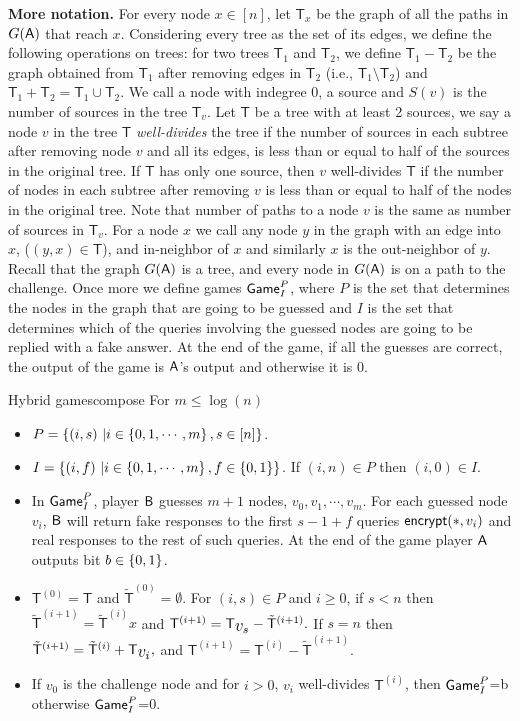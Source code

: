 \documentclass{article}
\def\B{{\sf B}}
\def\A{{\sf A}}
\newcommand{\encrypt}{{\sf encrypt}}
\newcommand{\game}{{\sf Game}}
\newcommand{\T}{{\mathsf T}}
\newcommand{\gpi}{$\game^P_I$}
\newcommand{\dT}{{\mathsf{T}}}
\newcommand{\bigv}[1]{\mbox{\large $v_{#1}$}}
\newcommand{\bigt}[1]{{\dT}^{({#1})}}
\newcommand{\bigtb}[1]{\tilde{\dT}^{({#1})}}
\begin{document}
  \textbf{More notation.} For every node $x\in [n]$, let $\T_x$ be the graph of all the paths in $G(\A)$ that reach $x$. Considering every tree as the set of its edges, we define the following operations on trees: for two trees $\T_1$ and $\T_2$, we define $\T_1-\T_2$ be the graph obtained from $\T_1$ after removing edges in $\T_2$ (i.e., $ \T_1\setminus \T_2 $) and $\T_1+\T_2 = \T_1\cup \T_2$.  We call a node with indegree 0, a source and $S(v)$ is the number of sources in the tree $\T_v$.  Let $\T$ be a tree with at least 2 sources, we say a node $v$ in the tree $\T$ \textit{well-divides} the tree if the number of sources in each subtree after removing node $v$ and all its edges, is less than or equal to half of the sources in the original tree. If $\T$ has only one source, then $v$ well-divides $\T$ if the number of nodes in each subtree after removing $v$ is less than or equal to half of the nodes in the original tree. Note that number of paths to a node $v$ is the same as number of sources in $\T_v$. For a node $x$ we call any node $y$ in the graph with an edge into $x$, ($(y,x)\in \T$), and in-neighbor of $x$ and similarly $x$ is the out-neighbor of $y$.\\
  

  Recall that the graph $G(\A)$ is a tree, and every node in $G(\A)$ is on a path to the challenge. Once more we define games \gpi, where $P$ is the set that determines the nodes in the graph that are going to be guessed and $I$ is the set that determines which of the queries involving the guessed nodes are going to be replied with a fake answer. At the end of the game, if all the guesses are correct, the output of the game is $\A$'s output and otherwise it is 0.\\
\begin{boxfig}{Hybrid games}{compose}
For $m\leq \log (n)$
\begin{itemize}
  \item $P=\left\{ (i,s)\ | i \in \left\{ 0,1,\cdots,m \right\}, s\in [n] \right\} $.
  \item $I=\left\{ (i,f)\ | i \in \left\{ 0,1,\cdots,m \right\}, f\in \{0,1\} \right\}$. If $(i,n)\in P$ then $(i,0) \in I$. 
  \item In \gpi, player $\B$ guesses $m+1$ nodes, $v_0,v_1,\cdots,v_m$. For each guessed node $v_i$, $\B$ will return fake responses to the first $s-1+f$ queries $\encrypt(*,v_i)$ and real responses to the rest of such queries. At the end of the game player $\A$ outputs bit $b\in \{0,1\}$.
 \item $\bigt{0}=\T$ and $\bigtb{0}=\emptyset$. For $(i,s)\in P$ and $i\geq 0$, if $s<n$ then $\bigtb{i+1}=\bigtb{i}x$ and $\bigt{i+1}=\T_{\bigv{s}}-\bigtb{i+1}.$ If $s=n$ then $\bigtb{i+1}=\bigtb{i}+\T_{\bigv{i}},$ and $\bigt{i+1}=\bigt{i}- \bigtb{i+1}.$
\item If $v_0$ is the challenge node and for $i>0$, $v_i$ well-divides $\bigt{i}$, then \gpi=b otherwise \gpi=0. 
\end{itemize}
\end{boxfig}
\end{document}
